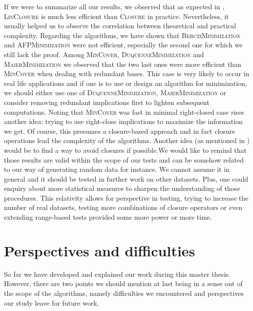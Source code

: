  If we were to summarize all our results, we observed that as expected
in \cite{bazhanov_optimizations_2014}, \textsc{LinClosure} is much less efficient than \textsc{Closure} in practice. Nevertheless, it usually helped
us to observe the correlation between theoretical and practical complexity.
Regarding the algorithms, we have shown that \textsc{BercziMinimization} and
\textsc{AFPMinimization} were not efficient, especially the second one for
which we still lack the proof. Among \textsc{MinCover}, \textsc{DuquenneMinimization} and \textsc{MaierMinimization} we observed that
the two last ones were more efficient than \textsc{MinCover} when dealing
with redundant bases. This case is very likely to occur in real life applications and if one is to use or design an algorithm for minimization, we should either use one of \textsc{DuquenneMinimization}, \textsc{MaierMinimization} or consider removing redundant implications first to lighten subsequent computations. Noting that \textsc{MinCover} was fast in minimal right-closed case rises another idea: trying to use right-close implications to maximize the information we get. Of course, this presumes a closure-based approach and in fact closure operations lead the complexity of the algorithms. Another idea (as mentioned in \cite{duquenne_variations_2007}) would be to find a way to avoid closures if possible.We would like to remind that those results are valid within the scope of our tests and can be somehow related to our way of generating random data for instance. We cannot assume it in general and it should be tested in further work on other datasets. Plus, one could enquiry about more statistical measures to sharpen the understanding of those procedures. This relativity allows for perspective in testing, trying to
increase the number of real datasets, testing more combinations of closure
operators or even extending range-based tests provided some more power or
more time.

\section{Perspectives and difficulties}

So far we have developed and explained our work during this master thesis. However, there are two points we should mention at last being in a sense out of 
the scope of the algorithms, namely difficulties we encountered and perspectives
our study leave for future work. 

\vspace{1.2em}

